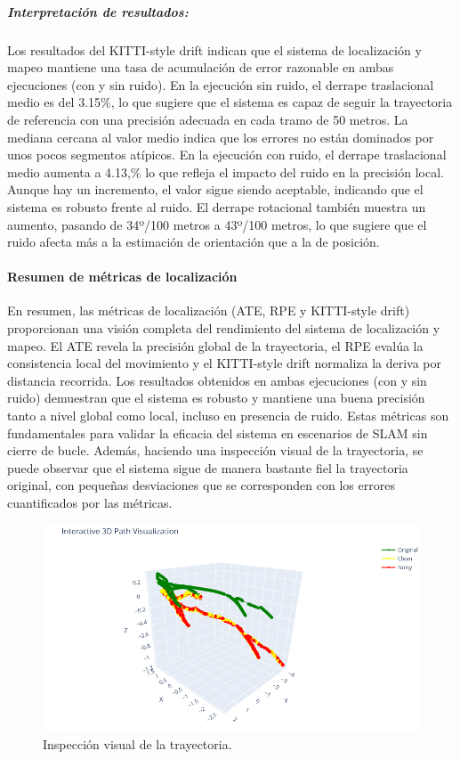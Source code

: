 \documentclass[12pt, a4paper, twoside]{article}
\begin{document}
\subparagraph{Interpretación de resultados:}
Los resultados del KITTI-style drift\cite{Geiger2013KITTI} indican que el sistema de localización y mapeo mantiene
una tasa de acumulación de error razonable en ambas ejecuciones (con y sin ruido).
En la ejecución sin ruido, el derrape traslacional medio es del 3.15\%, lo que sugiere que el sistema es capaz de seguir la trayectoria de referencia con una
precisión adecuada en cada tramo de 50 metros. La mediana cercana al valor medio indica
que los errores no están dominados por unos pocos segmentos atípicos.\newline
En la ejecución con ruido, el derrape traslacional medio aumenta a 4.13,\% lo que refleja el impacto del ruido en la precisión local.
Aunque hay un incremento, el valor sigue siendo aceptable, indicando que el sistema es robusto frente al ruido.
El derrape rotacional también muestra un aumento, pasando de 34º/100 metros a 43º/100 metros, lo que sugiere que el ruido afecta más a la estimación de orientación que
a la de posición.\newline

\paragraph{Resumen de métricas de localización}
En resumen, las métricas de localización (ATE, RPE y KITTI-style drift\cite{Geiger2013KITTI}) proporcionan una visión completa del rendimiento del sistema de localización y mapeo.
El ATE\cite{Chen2022DELOATE} revela la precisión global de la trayectoria, el RPE\cite{Sturm2012RPE} evalúa la consistencia local del movimiento y el KITTI-style drift\cite{Geiger2013KITTI} normaliza la deriva por distancia recorrida.
Los resultados obtenidos en ambas ejecuciones (con y sin ruido) demuestran que el sistema es robusto y mantiene una buena precisión tanto a nivel global como local, incluso en presencia de ruido.
Estas métricas son fundamentales para validar la eficacia del sistema en escenarios de SLAM\cite{smith1987slam} sin cierre de bucle. Además, haciendo una inspección visual de la trayectoria, se puede observar que el sistema sigue de manera bastante fiel la trayectoria original,
con pequeñas desviaciones que se corresponden con los errores cuantificados por las métricas.

\begin{figure}[h]
  \centering
    \includegraphics[width=1\textwidth]{full_path.png}
  \caption{Inspección visual de la trayectoria.}
\end{figure} 
\end{document}
